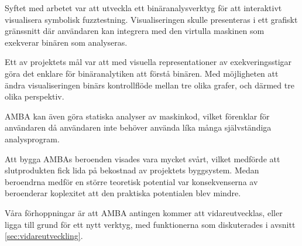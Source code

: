 Syftet med arbetet var att utveckla ett binäranalysverktyg för att interaktivt
visualisera symbolisk fuzztestning. Visualiseringen skulle presenteras i ett
grafiskt gränssnitt där användaren kan integrera med den virtulla maskinen som
exekverar binären som analyseras.

Ett av projektets mål var att med visuella representationer av exekveringsstigar
göra det enklare för binäranalytiken att förstå binären. Med möjligheten att
ändra visualiseringen binärs kontrollflöde mellan tre olika grafer, och därmed
tre olika perspektiv.

AMBA kan även göra statiska analyser av maskinkod, vilket förenklar för
användaren då användaren inte behöver använda líka många självständiga
analysprogram.

Att bygga AMBAs beroenden visades vara mycket svårt, vilket medförde att
slutprodukten fick lida på bekostnad av projektets byggsystem. Medan beroendrna
medför en större teoretisk potential var konsekvenserna av beroenderar
koplexitet att den praktiska potentialen blev mindre.

Våra förhoppningar är att AMBA antingen kommer att vidareutvecklas, eller ligga
till grund för ett nytt verktyg, med funktionerna som diskuterades i avsnitt
\ref{sec:vidareutveckling}.